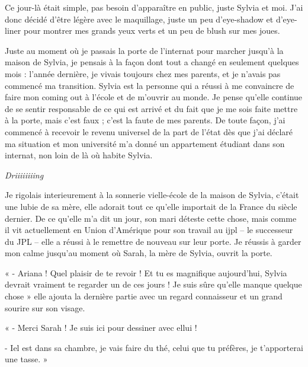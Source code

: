 \documentclass[12pt,hidelinks,a4paper]{book}
\begin{document}
\bigskip

Ce jour-là était simple, pas besoin d'apparaître en public, juste
Sylvia et moi. J'ai donc décidé d'être légère avec le maquillage,
juste un peu d'eye-shadow et d'eye-liner pour montrer mes grands yeux
verts et un peu de blush sur mes joues.\par

\bigskip

Juste au moment où je passais la porte de l'internat pour marcher
jusqu'à la maison de Sylvia, je pensais à la façon dont tout a changé
en seulement quelques mois : l'année dernière, je vivais toujours
chez mes parents, et je n'avais pas commencé ma transition. Sylvia
est la personne qui a réussi à me convaincre de faire mon coming out
à l'école et de m'ouvrir au monde. Je pense qu'elle continue de se
sentir responsable de ce qui est arrivé et du fait que je me sois
faite mettre à la porte, mais c'est faux ; c'est la faute de mes parents.
De toute façon, j'ai commencé à recevoir le revenu universel de la
part de l'état dès que j'ai déclaré ma situation et mon université
m'a donné un appartement étudiant dans son internat, non loin de là
où habite Sylvia.\par

\bigskip

\textit{Driiiiiiiing}\par

Je rigolais interieurement à la sonnerie vielle-école de la maison
de Sylvia, c'était une lubie de sa mère, elle adorait tout ce qu'elle
importait de la France du siècle dernier. De ce qu'elle m'a dit un
jour, son mari déteste cette chose, mais comme il vit actuellement
en Union d'Amérique pour son travail au \gls{ijpl} -- le successeur
du JPL -- elle a réussi à le remettre de nouveau sur leur porte.
Je réussis à garder mon calme jusqu'au moment où Sarah, la mère de
Sylvia, ouvrit la porte.\par

\bigskip

« - Ariana ! Quel plaisir de te revoir ! Et tu es magnifique aujourd'hui,
Sylvia devrait vraiment te regarder un de ces jours ! Je suis sûre
qu'elle manque quelque chose » elle ajouta la dernière partie avec
un regard connaisseur et un grand sourire sur son visage.

« - Merci Sarah ! Je suis ici pour dessiner avec ellui !

- Iel est dans sa chambre, je vais faire du thé, celui que tu préfères,
je t'apporterai une tasse. »
\end{document}
